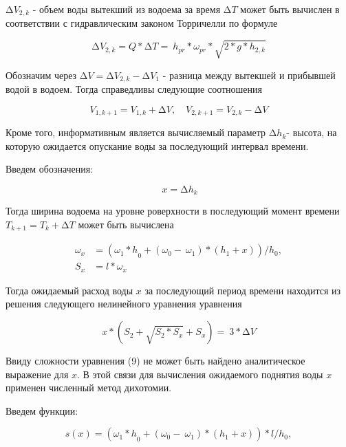 \begin{multicols}{2}
\(\mathrm{\Delta}V_{2,k}\) - объем воды вытекший из водоема за время
\(\mathrm{\Delta}T\) может быть вычислен в соответствии с гидравлическим
законом Торричелли по формуле

\begin{equation}
\mathrm{\Delta}V_{2,k} = Q*\mathrm{\Delta}T = \ h_{pr}*\omega_{pr}*\sqrt{2*g*h_{2,k}}
\end{equation}

Обозначим через
\(\mathrm{\Delta}V = \mathrm{\Delta}V_{2,k} - \mathrm{\Delta}V_{1}\) -
разница между вытекшей и прибывшей водой в водоем. Тогда справедливы
следующие соотношения

\begin{equation}
V_{1,k + 1} = V_{1,k} + \mathrm{\Delta}V,\quad V_{2,k + 1} = V_{2,k} - \mathrm{\Delta}V
\end{equation}

Кроме того, информативным является вычисляемый параметр
\({\mathrm{\Delta}h}_{k}\)- высота, на которую ожидается опускание воды
за последующий интервал времени.

Введем обозначения:

\[\ {x = \mathrm{\Delta}h}_{k}\]

Тогда ширина водоема на уровне роверхности в последующий момент времени
\(T_{k + 1} = T_{k} + \mathrm{\Delta}T\) может быть вычислена

\begin{equation}
\begin{aligned}
\omega_{x} &= ({\omega_{1}*h}_{0} + \left( \omega_{0} - \ \omega_{1} \right)*(h_{1} + x))/h_{0}, \\
S_{x} &= l*\omega_{x}
\end{aligned}
\end{equation}

Тогда ожидаемый расход воды \(x\) за последующий период времени
находится из решения следующего нелинейного уравнения уравнения

\begin{equation}
x*\left( S_{2} + \sqrt{S_{2}*S_{x}} + S_{x} \right) = \ 3*\mathrm{\Delta}V
\end{equation}

Ввиду сложности уравнения (9) не может быть найдено аналитическое
выражение для \(x\). В этой связи для вычисления ожидаемого поднятия
воды \(x\ \)применен численный метод дихотомии.
\end{multicols}

Введем функции\(:\)

\begin{equation}
s(x) = \left( {\omega_{1}*h}_{0} + \left( \omega_{0} - \ \omega_{1} \right)*\left( h_{1} + x \right) \right)*l/h_{0},
\end{equation}

